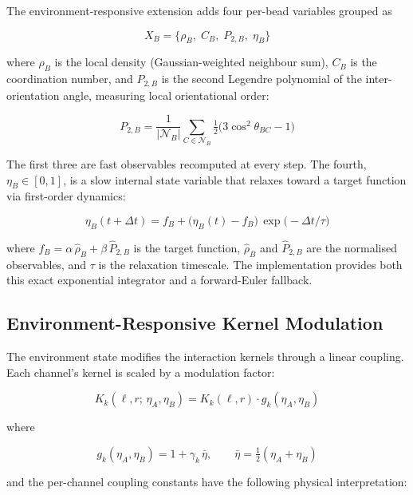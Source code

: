 ﻿\documentclass[11pt]{article}
\begin{document}
The environment-responsive extension adds four per-bead variables grouped as

\begin{equation}
\label{eq:env-state}
  X_B = \bigl\{\rho_B,\; C_B,\; P_{2,B},\; \eta_B\bigr\}
\end{equation}

where $\rho_B$ is the local density (Gaussian-weighted neighbour sum), $C_B$
is the coordination number, and $P_{2,B}$ is the second Legendre polynomial
of the inter-orientation angle, measuring local orientational order:

\[
  P_{2,B} = \frac{1}{|\mathcal{N}_B|}
    \sum_{C \in \mathcal{N}_B}
    \tfrac{1}{2}\bigl(3\cos^2\theta_{BC} - 1\bigr)
\]

The first three are fast observables recomputed at every step. The fourth,
$\eta_B \in [0,1]$, is a slow internal state variable that relaxes toward a
target function via first-order dynamics:

\begin{equation}
\label{eq:eta-relax}
  \eta_B(t + \Delta t)
    = f_B + \bigl(\eta_B(t) - f_B\bigr)\,\exp\!\bigl(-\Delta t / \tau\bigr)
\end{equation}

where $f_B = \alpha\,\hat{\rho}_B + \beta\,\hat{P}_{2,B}$ is the target
function, $\hat{\rho}_B$ and $\hat{P}_{2,B}$ are the normalised observables,
and $\tau$ is the relaxation timescale. The implementation provides both
this exact exponential integrator and a forward-Euler fallback.

\subsection{Environment-Responsive Kernel Modulation}

The environment state modifies the interaction kernels through a linear
coupling. Each channel's kernel is scaled by a modulation factor:

\begin{equation}
\label{eq:modulation}
  K_k(\ell, r;\, \eta_A, \eta_B)
    = K_k(\ell, r) \cdot g_k(\eta_A, \eta_B)
\end{equation}

where

\[
  g_k(\eta_A, \eta_B) = 1 + \gamma_k \, \bar{\eta},
  \qquad
  \bar{\eta} = \tfrac{1}{2}(\eta_A + \eta_B)
\]

and the per-channel coupling constants have the following physical
interpretation:
\end{document}
